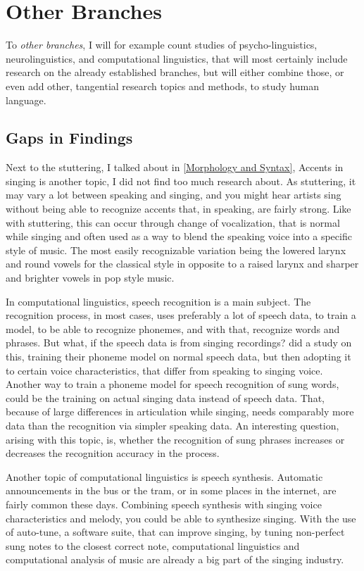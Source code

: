 \section{Other Branches}
\label{Other Branches}

To \textit{other branches}, I will for example count studies of psycho-linguistics, neurolinguistics, and computational linguistics, that will most certainly include research on the already established branches, but will either combine those, or even add other, tangential research topics and methods, to study human language. 

\subsection*{Gaps in Findings}

Next to the stuttering, I talked about in \autoref{Morphology and Syntax}, Accents in singing is another topic, I did not find too much research about. As stuttering, it may vary a lot between speaking and singing, and you might hear artists sing without being able to recognize accents that, in speaking, are fairly strong. Like with stuttering, this can occur through change of vocalization, that is normal while singing and often used as a way to blend the speaking voice into a specific style of music. The most easily recognizable variation being the lowered larynx and round vowels for the classical style in opposite to a raised larynx and sharper and brighter vowels in pop style music.

In computational linguistics, speech recognition is a main subject. The recognition process, in most cases, uses preferably a lot of speech data, to train a model, to be able to recognize phonemes, and with that, recognize words and phrases. But what, if the speech data is from singing recordings? \cite{mesaros2012singing} did a study on this, training their phoneme model on normal speech data, but then adopting it to certain voice characteristics, that differ from speaking to singing voice. Another way to train a phoneme model for speech recognition of sung words, could be the training on actual singing data instead of speech data. That, because of large differences in articulation while singing, needs comparably more data than the recognition via simpler speaking data. An interesting question, arising with this topic, is, whether the recognition of sung phrases increases or decreases the recognition accuracy in the process.

Another topic of computational linguistics is speech synthesis. Automatic announcements in the bus or the tram, or in some places in the internet, are fairly common these days. Combining speech synthesis with singing voice characteristics and melody, you could be able to synthesize singing. With the use of auto-tune, a software suite, that can improve singing, by tuning non-perfect sung notes to the closest correct note, computational linguistics and computational analysis of music are already a big part of the singing industry.
